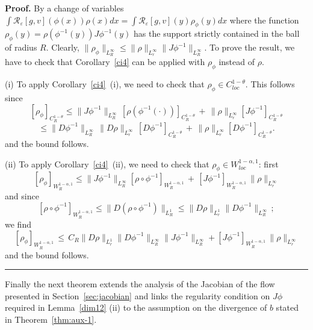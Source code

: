 \documentclass[a4paper,11pt]{article}
\newenvironment{proof}[1][Proof]{\textbf{#1.} }{\ \rule{0.5em}{0.5em}}
\begin{document}
\begin{proof}
 By a change of variables $ \int\mathcal{R}_{\varepsilon}[
g,v] (  \phi(  x) )  \rho( x) dx=\int\mathcal{R}_{\varepsilon}[ g,v]
(  y)  \rho_{\phi}(  y) dx $ where the function
 $ \rho_{\phi}(  y)  =\rho(  \phi^{-1}( y) )
 J\phi^{-1}(  y)
 $
 has the support strictly contained in the ball
of radius $R$. Clearly, $
 \|  \rho_{\phi}\| _{L_{R}^{\infty}}\leq \| \rho\|
_{L_{r}^{\infty}}\| J\phi^{-1}\| _{L_{R}^{\infty}}. $
To prove the result, we  have to check that Corollary~\ref{ci4}
can be applied with $\rho_{\phi}$ instead of $\rho$.

(i) To apply Corollary~\ref{ci4}~(i), we need to check that
 $ \rho_{\phi} \in C^{1 -\theta}_{loc}$. This follows since
$$
[\rho_{\phi} ]_{ C^{1 -\theta}_{R}} \le
 \| J\phi^{-1}\|
_{L_{R}^{\infty}} \, [\rho ({\phi}^{-1} (\cdot) ) ]_{ C^{1
-\theta}_{R}} \, + \, \| \rho \|_{L_{r}^{\infty}}
 [J\phi^{-1}]_{C^{1 -\theta}_{R}}
$$
$$
\le  \| D\phi^{-1}\| _{L_{R}^{\infty}} \,  \| D\rho\|
_{L_{r}^{\infty}} \, [ D\phi^{-1}]_{C^{1 -\theta}_{R}}
 \, + \, \| \rho \|_{L_{r}^{\infty}}
 [D\phi^{-1}]_{C^{1 -\theta}_{R}}.
$$
and the bound follows.

\medskip (ii) To apply Corollary~\ref{ci4}~(ii), we
  need to check that
 $ \rho_{\phi} \in W^{1- \alpha,1}_{loc}$: first
$$ [\rho_{\phi} ]_{W^{1 - \alpha, 1}_R }
\le  \| J\phi^{-1}\| _{L_{R}^{\infty}} [\rho \circ \phi^{-1}]_{W^{1- \alpha,1}_R}
 \, + \,
 [J \phi^{-1} ]_{W^{1- \alpha,1}_R} \, \| \rho\|
_{L_{r}^{\infty}}
$$
and since
$$
[\rho \circ \phi^{-1}]_{W^{1- \alpha,1}_R} \le \|D (\rho \circ \phi^{-1})\|_{L^1_R} \le \|D\rho\|_{L^1_r} \|D \phi^{-1}\|_{L^\infty_R} \,;
$$
we find
$$
[\rho_{\phi} ]_{W^{1 - \alpha, 1}_R } \, \le \,  C_R \|D\rho\|_{L^1_r} \|D \phi^{-1}\|_{L^\infty_R} \| J\phi^{-1}\| _{L_{R}^{\infty}} + [J \phi^{-1} ]_{W^{1-
\alpha,1}_R} \, \| \rho\| _{L_{r}^{\infty}}
$$
and the bound follows.
\end{proof}

Finally the next theorem extends the analysis of the Jacobian of the flow presented in Section~\ref{sec:jacobian} and links the regularity condition on $J\phi$ required in  Lemma~\ref{dim12} (ii) to the assumption on the divergence of $b$ stated in Theorem~\ref{thm:aux-1}.
\end{document}
